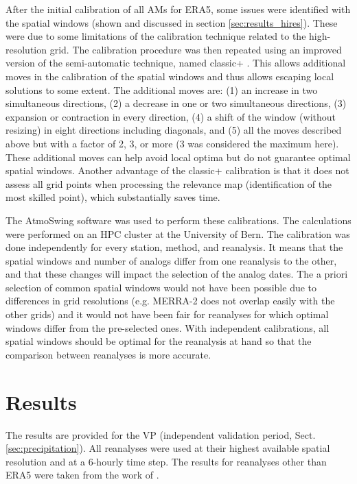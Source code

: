 \documentclass[alpha-refs]{wiley-article}
\begin{document}
After the initial calibration of all AMs for ERA5, some issues were identified with the spatial windows (shown and discussed in section \ref{sec:results_hires}). These were due to some limitations of the calibration technique related to the high-resolution grid. The calibration procedure was then repeated using an improved version of the semi-automatic technique, named classic+ \citep{Horton2019}. This allows additional moves in the calibration of the spatial windows and thus allows escaping local solutions to some extent. The additional moves are: (1) an increase in two simultaneous directions, (2) a decrease in one or two simultaneous directions, (3) expansion or contraction in every direction, (4) a shift of the window (without resizing) in eight directions including diagonals, and (5) all the moves described above but with a factor of 2, 3, or more (3 was considered the maximum here). These additional moves can help avoid local optima but do not guarantee optimal spatial windows. Another advantage of the classic+ calibration is that it does not assess all grid points when processing the relevance map (identification of the most skilled point), which substantially saves time.

The AtmoSwing software \citep{Horton2019} was used to perform these calibrations. The calculations were performed on an HPC cluster at the University of Bern. The calibration was done independently for every station, method, and reanalysis. It means that the spatial windows and number of analogs differ from one reanalysis to the other, and that these changes will impact the selection of the analog dates. The a priori selection of common spatial windows would not have been possible due to differences in grid resolutions (e.g. MERRA-2 does not overlap easily with the other grids) and it would not have been fair for reanalyses for which optimal windows differ from the pre-selected ones. With independent calibrations, all spatial windows should be optimal for the reanalysis at hand so that the comparison between reanalyses is more accurate.


\section{Results}
\label{sec:results}

The results are provided for the VP (independent validation period, Sect. \ref{sec:precipitation}). All reanalyses were used at their highest available spatial resolution and at a 6-hourly time step. The results for reanalyses other than ERA5 were taken from the work of \citet{Horton2018b}.
\end{document}
